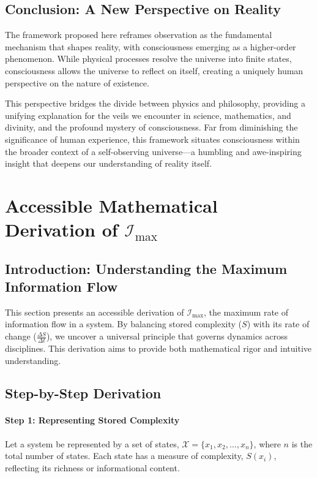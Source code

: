 \documentclass[12pt]{article}
\begin{document}
\subsection{Conclusion: A New Perspective on Reality}

The framework proposed here reframes observation as the fundamental mechanism that shapes reality, with consciousness emerging as a higher-order phenomenon. While physical processes resolve the universe into finite states, consciousness allows the universe to reflect on itself, creating a uniquely human perspective on the nature of existence.

This perspective bridges the divide between physics and philosophy, providing a unifying explanation for the veils we encounter in science, mathematics, and divinity, and the profound mystery of consciousness. Far from diminishing the significance of human experience, this framework situates consciousness within the broader context of a self-observing universe—a humbling and awe-inspiring insight that deepens our understanding of reality itself.


\section{Accessible Mathematical Derivation of \(\mathcal{I}_{\text{max}}\)}

\subsection{Introduction: Understanding the Maximum Information Flow}
This section presents an accessible derivation of \(\mathcal{I}_{\text{max}}\), the maximum rate of information flow in a system. By balancing stored complexity (\(S\)) with its rate of change (\(\frac{\Delta S}{\Delta t}\)), we uncover a universal principle that governs dynamics across disciplines. This derivation aims to provide both mathematical rigor and intuitive understanding.

\subsection{Step-by-Step Derivation}

\paragraph{Step 1: Representing Stored Complexity}
Let a system be represented by a set of states, \(\mathcal{X} = \{x_1, x_2, \ldots, x_n\}\), where \(n\) is the total number of states. Each state has a measure of complexity, \(S(x_i)\), reflecting its richness or informational content.
\end{document}
